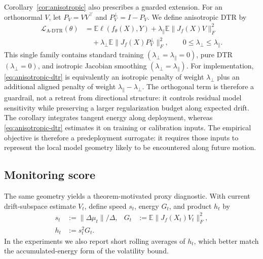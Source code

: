 \documentclass[conference]{IEEEtran}
\newcommand{\E}{\mathbb{E}}
\begin{document}
Corollary~\ref{cor:anisotropic} also prescribes a guarded extension. For an orthonormal $V$, let $P_V=VV^\top$ and $P_V^\perp=I-P_V$. We define anisotropic DTR by
\begin{equation}
\label{eq:anisotropic-dtr}
\begin{split}
\mathcal L_{\mathrm{A\text{-}DTR}}(\theta)
&=\E\ell(f_\theta(X),Y)
+\lambda_\parallel\E\|J_f(X)V\|_F^2\\
&\quad+\lambda_\perp\E\|J_f(X)P_V^\perp\|_F^2,
\qquad 0\leq\lambda_\perp\leq\lambda_\parallel.
\end{split}
\end{equation}
This single family contains standard training $(\lambda_\perp=\lambda_\parallel=0)$, pure DTR $(\lambda_\perp=0)$, and isotropic Jacobian smoothing $(\lambda_\perp=\lambda_\parallel)$. For implementation, \eqref{eq:anisotropic-dtr} is equivalently an isotropic penalty of weight $\lambda_\perp$ plus an additional aligned penalty of weight $\lambda_\parallel-\lambda_\perp$. The orthogonal term is therefore a guardrail, not a retreat from directional structure: it controls residual model sensitivity while preserving a larger regularization budget along expected drift.
The corollary integrates tangent energy along deployment, whereas \eqref{eq:anisotropic-dtr} estimates it on training or calibration inputs. The empirical objective is therefore a predeployment surrogate: it requires those inputs to represent the local model geometry likely to be encountered along future motion.

\subsection{Monitoring score}
The same geometry yields a theorem-motivated proxy diagnostic. With current drift-subspace estimate $V_t$, define speed $s_t$, energy $G_t$, and product $h_t$ by
\begin{equation}
\label{eq:hazard-score}
\begin{aligned}
s_t&:=\|\Delta\mu_t\|/\Delta,
&
G_t&:=\E\|J_f(X_t)V_t\|_F^2, \\
h_t&:=s_t^2G_t.
\end{aligned}
\end{equation}
In the experiments we also report short rolling averages of $h_t$, which better match the accumulated-energy form of the volatility bound.
\end{document}
